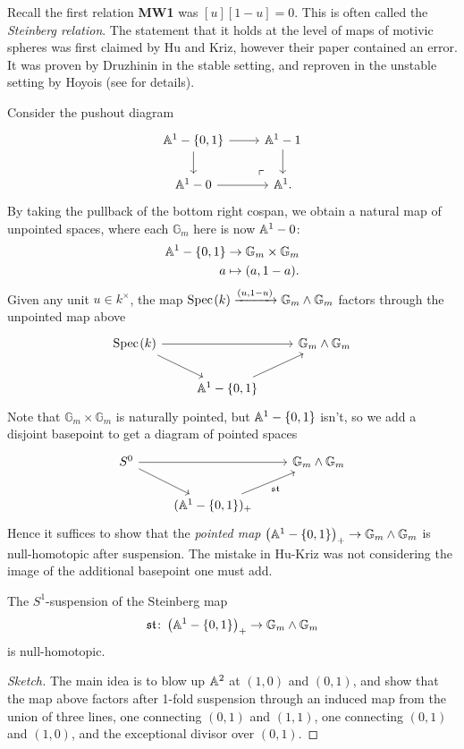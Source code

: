 \documentclass[11pt,openany]{book}
\let\smashprod\wedge
\begin{document}
Recall the first relation \textbf{MW1} was $[u][1-u] = 0$. This is often called the \textit{Steinberg relation}. The statement that it holds at the level of maps of motivic spheres was first claimed by Hu and Kriz, however their paper contained an error. It was proven by Druzhinin in the stable setting, and reproven in the unstable setting by Hoyois (see \cite{Hoyois-Steinberg} for details).

Consider the pushout diagram
\[ \begin{tikzcd}
    \A^1 - \left\{ 0,1 \right\}\rar\dar & \A^1-1\dar\\
    \A^1-0\rar & \A^1.\po
\end{tikzcd} \]
By taking the pullback of the bottom right cospan, we obtain a natural map of unpointed spaces, where each $\mathbb{G}_m$ here is now $\mathbb{A}^1-0$:
\begin{align*}
    \mathbb{A}^1 - \left\{ 0,1 \right\} &\to \mathbb{G}_m \times \mathbb{G}_m \\
    a &\mapsto (a,1-a).
\end{align*}
%
Given any unit $u \in k^\times$, the map $\Spec(k) \xto{(u,1-u)} \mathbb{G}_m \smashprod \mathbb{G}_m$ factors through the unpointed map above
\[ \begin{tikzcd}
    \Spec(k)\ar[rr]\ar[dr] & & \mathbb{G}_m \smashprod \mathbb{G}_m\\
     & \A^1-\left\{ 0,1 \right\}\ar[ur]
\end{tikzcd} \]
Note that $\mathbb{G}_m \times \mathbb{G}_m$ is naturally pointed, but $\mathbb{A}^1 - \left\{ 0,1 \right\}$ isn't, so we add a disjoint basepoint to get a diagram of pointed spaces
\[ \begin{tikzcd}
    S^0\ar[rr]\ar[dr] & & \mathbb{G}_m \smashprod \mathbb{G}_m\\
     & (\A^1-\left\{ 0,1 \right\})_+\ar[ur,"\mathfrak{st}" below right]
\end{tikzcd} \]
Hence it suffices to show that the \textit{pointed map} $\left( \A^1 - \left\{ 0,1 \right\} \right)_+ \to \mathbb{G}_m \smashprod \mathbb{G}_m$ is null-homotopic after suspension. The mistake in Hu-Kriz was not considering the image of the additional basepoint one must add.

\begin{theorem} \cite{Hoyois-Steinberg} The $S^1$-suspension of the Steinberg map
\begin{align*}
    \mathfrak{st} \colon \left( \A^1-\left\{ 0,1 \right\} \right)_+ \to \mathbb{G}_m \smashprod \mathbb{G}_m
\end{align*}
is null-homotopic.
\end{theorem}
\begin{proof}[Sketch] The main idea is to blow up $\mathbb{A}^2$ at $(1,0)$ and $(0,1)$, and show that the map above factors after 1-fold suspension through an induced map from the union of three lines, one connecting $(0,1)$ and $(1,1)$, one connecting $(0,1)$ and $(1,0)$, and the exceptional divisor over $(0,1)$.
\end{proof}
\end{document}
